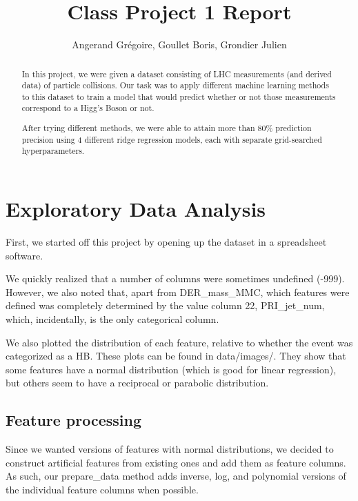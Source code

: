 \documentclass[11pt,conference,compsocconf]{IEEEtran}
\begin{document}
\title{Class Project 1 Report}

\author{
  Angerand Gr\'egoire, Goullet Boris, Grondier Julien 
}

\maketitle

\begin{abstract}
In this project, we were given a dataset consisting of LHC measurements (and derived data) of particle collisions. Our task was to apply different machine learning methods to this dataset to train a model that would predict whether or not those measurements correspond to a Higg's Boson or not.

After trying different methods, we were able to attain more than 80\% prediction precision using 4 different ridge regression models, each with separate grid-searched hyperparameters.
\end{abstract}

\section{Exploratory Data Analysis}
First, we started off this project by opening up the dataset in a spreadsheet software.

We quickly realized that a number of columns were sometimes undefined (-999). However, we also noted that, apart from DER\_mass\_MMC, which features were defined was completely determined by the value column 22, PRI\_jet\_num, which, incidentally, is the only categorical column. %

We also plotted the distribution of each feature, relative to whether the event was categorized as a HB. These plots can be found in data/images/. They show that some features have a normal distribution (which is good for linear regression), but others seem to have a reciprocal or parabolic distribution.

\subsection*{Feature processing}
Since we wanted versions of features with normal distributions, we decided to construct artificial features from existing ones and add them as feature columns. As such, our prepare\_data method adds inverse, log, and polynomial versions of the individual feature columns when possible.
\end{document}
